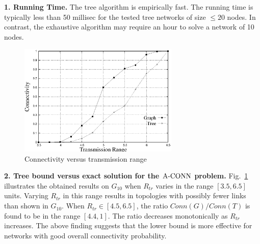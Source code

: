\nwline
{\bf 1. Running Time.}
The tree algorithm is empirically fast. The running time is typically
less than 50 millisec for the tested tree networks of size $\leq 20$ nodes.
In contrast, the exhaustive algorithm may require an hour to solve
a network of 10 nodes.


\noindent
     \begin{figure}[htbp]
     \begin{center}
     \includegraphics[width=3.0in]{conn-vs-trans.eps}
     \caption{Connectivity versus transmission range}
     \label{sim:conn:vs:trans}
     \end{center}
     \end{figure}

{\bf 2. Tree bound versus exact solution for the ${\mathrm {A\mbox{-}CONN}}$ problem.}
%
Fig.~\ref{sim:conn:vs:trans} illustrates the obtained results on $G_{10}$
when $R_{tr}$ varies in the range $[3.5,6.5]$ units.
%
Varying $R_{tr}$ in this range results in topologies with possibly
fewer links than shown in $G_{10}$.
%
When $R_{tr} \in [4.5,6.5]$, the ratio $Conn(G)/Conn(T)$ is found to be
in the range $[4.4,1]$. The ratio decreases monotonically as $R_{tr}$
increases.
%
The above finding suggests that the lower bound is more effective for
networks with good overall connectivity probability.

